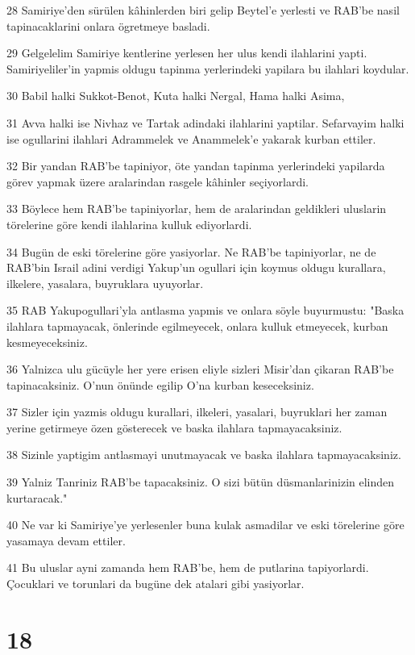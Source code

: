 \par 28 Samiriye'den sürülen kâhinlerden biri gelip Beytel'e yerlesti ve RAB'be nasil tapinacaklarini onlara ögretmeye basladi.
\par 29 Gelgelelim Samiriye kentlerine yerlesen her ulus kendi ilahlarini yapti. Samiriyeliler'in yapmis oldugu tapinma yerlerindeki yapilara bu ilahlari koydular.
\par 30 Babil halki Sukkot-Benot, Kuta halki Nergal, Hama halki Asima,
\par 31 Avva halki ise Nivhaz ve Tartak adindaki ilahlarini yaptilar. Sefarvayim halki ise ogullarini ilahlari Adrammelek ve Anammelek'e yakarak kurban ettiler.
\par 32 Bir yandan RAB'be tapiniyor, öte yandan tapinma yerlerindeki yapilarda görev yapmak üzere aralarindan rasgele kâhinler seçiyorlardi.
\par 33 Böylece hem RAB'be tapiniyorlar, hem de aralarindan geldikleri uluslarin törelerine göre kendi ilahlarina kulluk ediyorlardi.
\par 34 Bugün de eski törelerine göre yasiyorlar. Ne RAB'be tapiniyorlar, ne de RAB'bin Israil adini verdigi Yakup'un ogullari için koymus oldugu kurallara, ilkelere, yasalara, buyruklara uyuyorlar.
\par 35 RAB Yakupogullari'yla antlasma yapmis ve onlara söyle buyurmustu: "Baska ilahlara tapmayacak, önlerinde egilmeyecek, onlara kulluk etmeyecek, kurban kesmeyeceksiniz.
\par 36 Yalnizca ulu gücüyle her yere erisen eliyle sizleri Misir'dan çikaran RAB'be tapinacaksiniz. O'nun önünde egilip O'na kurban keseceksiniz.
\par 37 Sizler için yazmis oldugu kurallari, ilkeleri, yasalari, buyruklari her zaman yerine getirmeye özen gösterecek ve baska ilahlara tapmayacaksiniz.
\par 38 Sizinle yaptigim antlasmayi unutmayacak ve baska ilahlara tapmayacaksiniz.
\par 39 Yalniz Tanriniz RAB'be tapacaksiniz. O sizi bütün düsmanlarinizin elinden kurtaracak."
\par 40 Ne var ki Samiriye'ye yerlesenler buna kulak asmadilar ve eski törelerine göre yasamaya devam ettiler.
\par 41 Bu uluslar ayni zamanda hem RAB'be, hem de putlarina tapiyorlardi. Çocuklari ve torunlari da bugüne dek atalari gibi yasiyorlar.

\chapter{18}

